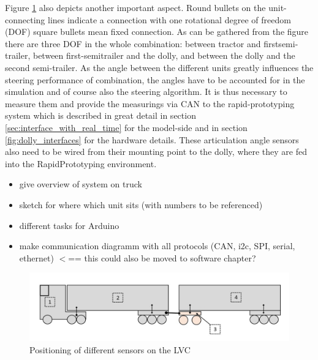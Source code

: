 \documentclass[ExampleMasters.tex]{subfiles}
\begin{document}
Figure \ref{fig:combination_overview_with_positions} also depicts another important aspect. Round bullets on the unit-connecting lines indicate a connection with one rotational degree of freedom (DOF) square bullets mean fixed connection. As can be gathered from the figure there are three DOF in the whole combination: between tractor and firstsemi-trailer, between first-semitrailer and the dolly, and between the dolly and the second semi-trailer. As the angle between the different units greatly influences the steering performance of combination, the angles have to be accounted for in the simulation and of course also the steering algorithm. It is thus necessary to measure them and provide the measurings via CAN to the rapid-prototyping system which is described in great detail in section \ref{sec:interface_with_real_time} for the model-side and in section \ref{fig:dolly_interfaces} for the hardware details. These articulation angle sensors also need to be wired from their mounting point to the dolly, where they are fed into the RapidPrototyping environment. 


\begin{itemize}
	\item give overview of system on truck
	\item sketch for where which unit sits (with numbers to be referenced)
	\item different tasks for Arduino
	\item make communication diagramm with all protocols (CAN, i2c, SPI, serial, ethernet) $<$== this could also be moved to software chapter?
	
\end{itemize}

\begin{figure}[ph]
\centering
\includegraphics[width=1\linewidth]{figures/combination_overview_with_positions}
\caption{Positioning of different sensors on the LVC}
\label{fig:combination_overview_with_positions}
\end{figure}
\end{document}
